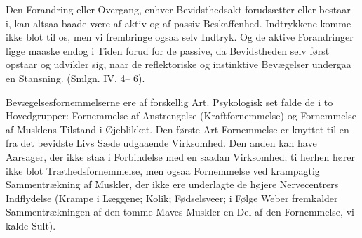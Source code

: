 \documentclass[12pt,a4paper,openany]{book}
\begin{document}
Den Forandring eller Overgang, enhver Bevidsthedsakt forudsætter eller
bestaar i, kan altsaa baade være af aktiv og af passiv Beskaffenhed.
Indtrykkene komme ikke blot til os, men vi frembringe ogsaa selv
Indtryk. Og de aktive Forandringer ligge maaske endog i Tiden forud for
de passive, da Bevidstheden selv først opstaar og udvikler sig, naar de
reflektoriske og instinktive Bevægelser undergaa en Stansning. (Smlgn.
IV, 4-- 6).

Bevægelsesfornemmelserne ere af forskellig Art. Psykologisk set falde de
i to Hovedgrupper: Fornemmelse af Anstrengelse (Kraftfornemmelse) og
Fornemmelse af Musklens Tilstand i Øjeblikket. Den første Art
Fornemmelse er knyttet til en fra det bevidste Livs Sæde udgaaende
Virksomhed. Den anden kan have Aarsager, der ikke staa i Forbindelse med
en saadan Virksomhed; ti herhen hører ikke blot Træthedsfornemmelse, men
ogsaa Fornemmelse ved krampagtig Sammentrækning af Muskler, der ikke ere
underlagte de højere Nervecentrers Indflydelse (Krampe i Læggene; Kolik;
Fødselsveer; i Følge Weber fremkalder Sammentrækningen af den tomme
Maves Muskler en Del af den Fornemmelse, vi kalde Sult).
\end{document}
